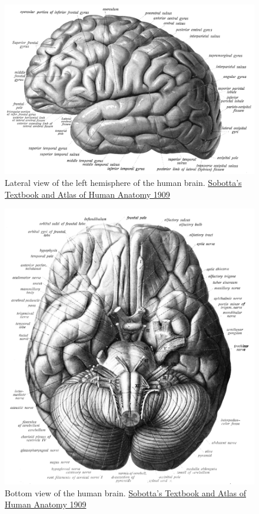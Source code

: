 \begin{figure}

{\centering \includegraphics[width=0.7\linewidth]{./figures/cns/Sobo_1909_626} 

}

\caption{Lateral view of the left hemisphere of the human brain. \href{https://commons.wikimedia.org/wiki/File:Sobo_1909_626.png}{Sobotta's Textbook and Atlas of Human Anatomy 1909}}\label{fig:lateralview}
\end{figure}



\begin{figure}

{\centering \includegraphics[width=0.7\linewidth]{./figures/cns/Sobo_1909_623} 

}

\caption{Bottom view of the human brain. \href{https://commons.wikimedia.org/wiki/File:Sobo_1909_623.png}{Sobotta's Textbook and Atlas of Human Anatomy 1909}}\label{fig:bottomview}
\end{figure}

